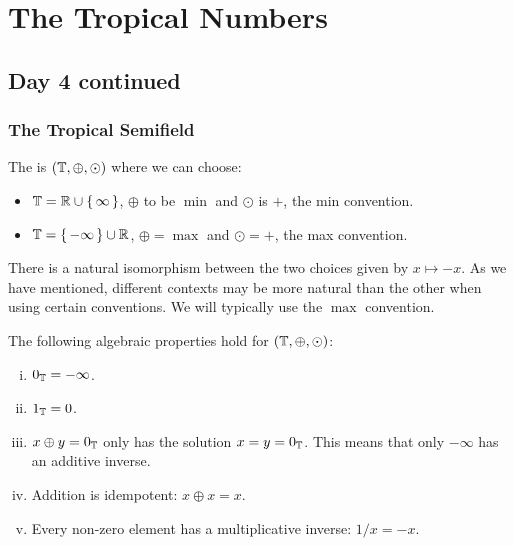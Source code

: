 \documentclass[12pt]{memoir}
\begin{document}
\chapter{The Tropical Numbers}

\section{Day 4 continued}

\subsection{The Tropical Semifield}

\begin{Def}
    The  is $(\mathbb{T},\oplus,\odot)$ where we can choose:
    \begin{itemize}
        \item $\mathbb{T}=\mathbb{R}\cup\{\,\infty\,\}$, $\oplus$ to be $\min$ and $\odot$ is $+$, the min convention.
        \item $\mathbb{T}=\{\,-\infty\,\}\cup\mathbb{R}$, $\oplus=\max$ and $\odot=+$, the max convention.
    \end{itemize}
\end{Def}

There is a natural isomorphism between the two choices given by $x\mapsto -x$. As we have mentioned, different contexts may be more natural than the other when using certain conventions. We will typically use the $\max$ convention. 

\begin{Prop}
The following algebraic properties hold for $(\mathbb{T},\oplus,\odot)$:
\begin{enumerate}[i)]
    \itemsep=-0.4em
    \item $0_{\mathbb{T}}=-\infty$.
    \item $1_{\mathbb{T}}=0$.
    \item $x\oplus y=0_{\mathbb{T}}$ only has the solution $x=y=0_{\mathbb{T}}$. This means that only $-\infty$ has an additive inverse.
    \item Addition is idempotent: $x\oplus x=x$.
    \item Every non-zero element has a multiplicative inverse: $1/x=-x$.
\end{enumerate}
\end{Prop}
\end{document}
